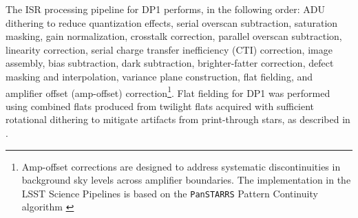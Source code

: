 The ISR processing pipeline for DP1 performs, in the following order: ADU dithering to reduce quantization effects, serial overscan subtraction, saturation masking, gain normalization, crosstalk correction, parallel overscan subtraction, linearity correction, serial charge transfer inefficiency (CTI) correction, image assembly, bias subtraction, dark subtraction, brighter-fatter correction, defect masking and interpolation, variance plane construction, flat fielding, and amplifier offset (amp-offset) correction\footnote{Amp-offset corrections are designed to address systematic discontinuities in background sky levels across amplifier boundaries. The implementation in the LSST Science Pipelines is based on the \texttt{PanSTARRS} Pattern Continuity algorithm \citep{2020ApJS..251....4W}}. 
Flat fielding for DP1 was performed using combined flats produced from twilight flats acquired with sufficient rotational dithering to mitigate artifacts from print-through stars, as described in . 



